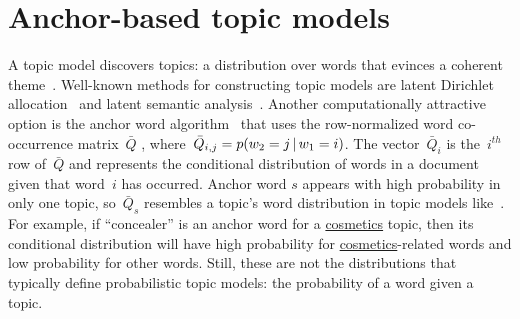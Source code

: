 \section{Anchor-based topic models}
\label{sec:background}

A topic model discovers topics: a distribution over words that evinces a coherent theme~\citep{boyd-graber-2017}.  Well-known methods for constructing topic models are latent Dirichlet allocation~\cite[]{blei-2003} and latent semantic analysis~\cite[]{landauer-1998}.  Another computationally attractive option is the anchor word algorithm~\citep{arora-2012-anchor} that uses the row-normalized word co-occurrence matrix~$\bar{Q}$ , where~$\bar{Q}_{i,j} = p(w_2 = j \, | \, w_1 = i)$. The vector~$\bar{Q}_i$ is the~$i^{th}$ row of~$\bar{Q}$ and represents the conditional distribution of words in a document given that word~$i$ has occurred.  Anchor word $s$ appears with high probability in only one topic, so~$\bar{Q}_{s}$
resembles a topic's word distribution in topic models like~.  For example, if ``concealer'' is an anchor word for a \underline{cosmetics} topic,
then its conditional distribution will have high probability for
\underline{cosmetics}-related words and low probability for other words.  Still, these are not the distributions that typically define probabilistic topic models: the probability of a word given a topic.


